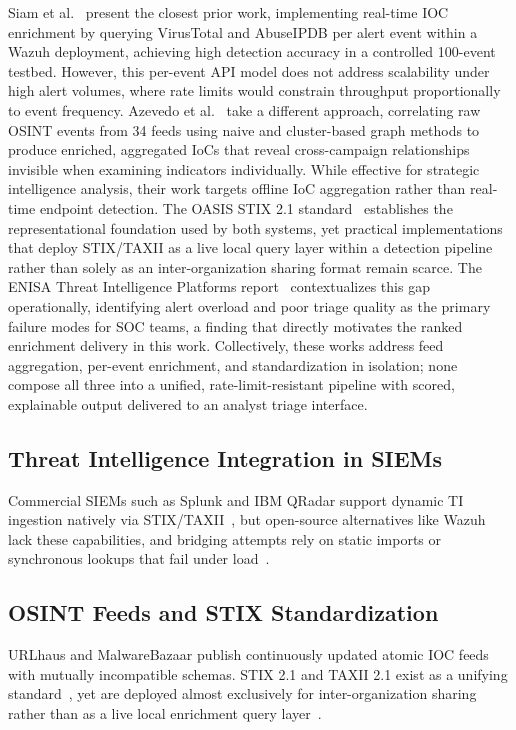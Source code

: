 \documentclass[conference]{IEEEtran}
\begin{document}
Siam et al.~\cite{siam} present the closest prior work, implementing real-time IOC enrichment by querying VirusTotal and AbuseIPDB per alert event within a Wazuh deployment, achieving high detection accuracy in a controlled 100-event testbed. However, this per-event API model does not address scalability under high alert volumes, where rate limits would constrain throughput proportionally to event frequency. Azevedo et al.~\cite{azevedo} take a different approach, correlating raw OSINT events from 34 feeds using naive and cluster-based graph methods to produce enriched, aggregated IoCs that reveal cross-campaign relationships invisible when examining indicators individually. While effective for strategic intelligence analysis, their work targets offline IoC aggregation rather than real-time endpoint detection. The OASIS STIX 2.1 standard~\cite{oasis} establishes the representational foundation used by both systems, yet practical implementations that deploy STIX/TAXII as a live local query layer within a detection pipeline rather than solely as an inter-organization sharing format remain scarce. The ENISA Threat Intelligence Platforms report~\cite{enisa} contextualizes this gap operationally, identifying alert overload and poor triage quality as the primary failure modes for SOC teams, a finding that directly motivates the ranked enrichment delivery in this work. Collectively, these works address feed aggregation, per-event enrichment, and standardization in isolation; none compose all three into a unified, rate-limit-resistant pipeline with scored, explainable output delivered to an analyst triage interface.

\subsection{Threat Intelligence Integration in SIEMs}
Commercial SIEMs such as Splunk and IBM QRadar support dynamic TI ingestion natively via STIX/TAXII~\cite{oasis}, but open-source alternatives like Wazuh lack these capabilities, and bridging attempts rely on static imports or synchronous lookups that fail under load~\cite{siam}.

\subsection{OSINT Feeds and STIX Standardization}
URLhaus and MalwareBazaar publish continuously updated atomic IOC feeds with mutually incompatible schemas. STIX 2.1 and TAXII 2.1 exist as a unifying standard~\cite{oasis}, yet are deployed almost exclusively for inter-organization sharing rather than as a live local enrichment query layer~\cite{azevedo}.
\end{document}
